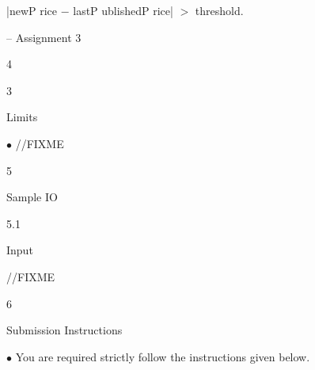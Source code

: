 \documentclass[a4paper,portrait,12pt]{article}
\begin{document}
\begin{flushleft}
|newP rice $-$ lastP ublishedP rice| $>$ threshold.
\end{flushleft}





\begin{flushleft}
\newpage
-- Assignment 3
\end{flushleft}





4





3





\begin{flushleft}
Limits
\end{flushleft}


\begin{flushleft}
$\bullet$ //FIXME
\end{flushleft}





5





\begin{flushleft}
Sample IO
\end{flushleft}





5.1





\begin{flushleft}
Input
\end{flushleft}





\begin{flushleft}
//FIXME
\end{flushleft}





6





\begin{flushleft}
Submission Instructions
\end{flushleft}


\begin{flushleft}
$\bullet$ You are required strictly follow the instructions given below.
\end{flushleft}
\end{document}
